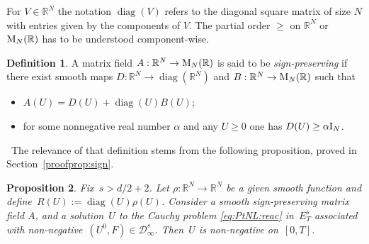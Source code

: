 \documentclass[JEP,XML,SOM,Unicode,published]{cedram}
\DeclareMathOperator{\diag}{diag}
\newtheorem{prop}{Proposition}[section]
\theoremstyle{definition}
\newtheorem{defi}[prop]{Definition}
\newcommand\R{\mathbb{R}}
\begin{document}
For $V\in\R^N$ the notation $\diag(V)$ refers to the diagonal square matrix of size $N$ with entries given by the components of $V$. The partial order $\geq$ on $\R^N$ or $\textnormal{M}_N(\R)$ has to be understood component-wise.
\begin{defi}\label{def:nonneg}
A matrix field $A:\R^N\to\textnormal{M}_N(\R)$ is said to be \emph{sign-preserving} if there exist smooth maps $D:\R^N\to\diag(\R^N)$ and $B:\R^N\to \textnormal{M}_N(\R)$ such that
\begin{itemize}
\item
$A(U)= D(U)+\diag(U)B(U)$;
\item
for some nonnegative real number $\alpha$ and any $U\geq 0$ one has $D(U)\geq \alpha\textnormal{I}_N$.
\end{itemize}
\end{defi} \
The relevance of that definition stems from the following proposition, proved in Section~\ref{proofprop:sign}.
\begin{prop}\label{prop:sign}
Fix~$s>d/2+2$. Let $\rho:\R^N\to\R^N$ be a given smooth function and define~$R(U):=\diag(U)\rho(U)$. Consider a smooth sign-preserving matrix field $A$, and a solution~$U$ to the Cauchy problem \eqref{eq:PtNL:reac}
in~$E_T^s$ associated with
non-negative~$(U^0,F)\in\mathcal{D}_\infty^s$. Then~$U$ is non-negative on~$[0,T]$.
\end{prop}
\end{document}
